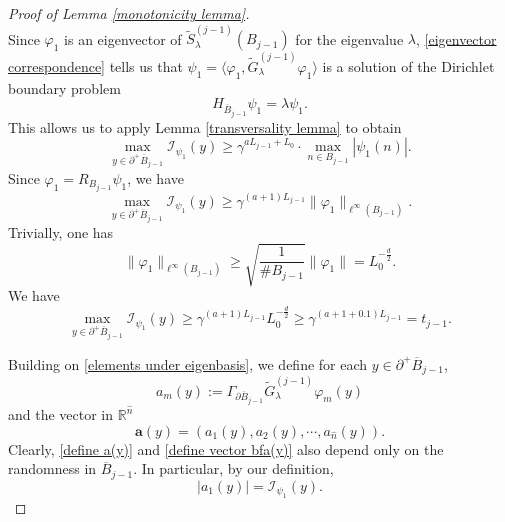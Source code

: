 \documentclass[11pt,reqno,UTF8,twoside]{amsart}
\newcommand{\R}{\mathbb{R}}
\newcommand{\mcI}{\mathcal{I}}
\newcommand{\whn}{\widehat{n}}
\newcommand{\barB}{\overline{B}}
\newcommand{\wtSjminusone}{\widetilde{S}^{(j-1)}}
\newcommand{\wtGjminusone}{\widetilde{G}^{(j-1)}}
\theoremstyle{definition}
\numberwithin{equation}{section}
\begin{document}
\begin{proof}[Proof of Lemma \ref{monotonicity lemma}]
\begin{equation}
\end{equation}
Since $\varphi_1$ is an eigenvector of $\wtSjminusone_{\lambda}(B_{j-1})$ for the  eigenvalue $\lambda$, \eqref{eigenvector correspondence} tells us that $\psi_1=\langle\varphi_1,\wtGjminusone_{\lambda}\varphi_1\rangle$ is a solution of the Dirichlet boundary problem 
\begin{equation}\label{psi1 satisfies the Dirichlet problem}
  H_{\barB_{j-1}} \psi_1=\lambda \psi_1 .
\end{equation}
This allows us to apply Lemma \ref{transversality lemma} to obtain
\[\max_{y\in \partial ^+\barB_{j-1}} \mcI_{\psi_1} (y) \geq \gamma^{aL_{j-1}+L_0} \cdot \max_{n\in B_{j-1}}|\psi_1(n)| .\]
Since  $\varphi_1=R_{B_{j-1}}\psi_1$, we have 
\begin{equation*}
  \max_{y\in \partial ^+\barB_{j-1}} \mcI_{\psi_1} (y)  \geq \gamma^{(a+1)L_{j-1}} \|\varphi_1\|_{\ell^{\infty}(B_{j-1})}.
\end{equation*}
Trivially, one has 
\[\| \varphi_1\| _{\ell^{\infty}(B_{j-1})}\geq \sqrt{\frac{1}{\# B_{j-1}}} \|\varphi_1\| =L_0^{-\frac{d}{2}}.\]
We have
\begin{equation}\label{transversality of psi1}
\max_{y\in \partial ^+\barB_{j-1}} \mcI_{\psi_1} (y)  \geq \gamma^{(a+1)L_{j-1}} L_0^{-\frac{d}{2}} \geq \gamma^{(a+1+0.1)L_{j-1}}=t_{j-1}.
\end{equation}



Building on \eqref{elements under eigenbasis}, we define for each $y\in \partial^+\barB_{j-1}$,
\begin{equation}\label{define a(y)}
  a_m(y):= \Gamma_{\partial \barB_{j-1}}  \wtGjminusone_{\lambda} \varphi_m (y)
\end{equation}
and the vector in $\R^{\whn}$
\begin{equation}\label{define vector bfa(y)}
  \mathbf{a}(y)=(a_1(y),a_2(y),\cdots,a_{\whn}(y)).
\end{equation}
Clearly, \eqref{define a(y)} and \eqref{define vector bfa(y)} also depend only on the randomness in $\barB_{j-1}$. In particular, by our definition, 
 \begin{equation}\label{a1 is influence}
 |a_1(y)|=\mcI_{\psi_1}(y) .
 \end{equation}






\end{proof}
\end{document}
